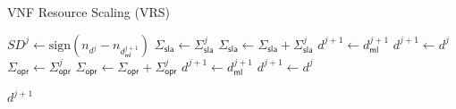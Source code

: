 \documentclass[conference, final]{IEEEtran}
\newcommand{\hlb}[2][blue]{{\color{#1} {#2}}\unskip }
\begin{document}
{\begin{algorithm}[t!]
	\caption{VNF Resource Scaling (VRS)}
	\label{alg:vrs}
	\begin{spacing}{1.05}
\begin{algorithmic}[1]
	
	\State $SD^{j} \gets \text{sign}(n_{d^{j}} - n_{d_{\textsf{ml}}^{j+1}})$
	\label{alg:vrs:SD}
			\State $\Sigma_{\textsf{sla}} \gets \Sigma_{\textsf{sla}}^{j}$
			\label{alg:vrs:new_up}
		\Else
			\State $\Sigma_{\textsf{sla}} \gets \Sigma_{\textsf{sla}} +  \Sigma_{\textsf{sla}}^{j}$
				\label{alg:vrs:sla_cost}
				\State $d^{j+1} \gets d_{\textsf{ml}}^{j+1}$
			\Else
				\State $d^{j+1} \gets d^{j}$
				\label{alg:vrs:scaleup}
			\EndIf		
		\EndIf
		\label{alg:vrs:down_suggest}
			\State $\Sigma_{\textsf{opr}} \gets \Sigma_{\textsf{opr}}^{j}$
		\Else
			\State $\Sigma_{\textsf{opr}} \gets \Sigma_{\textsf{opr}} +  \Sigma_{\textsf{opr}}^{j}$
				\label{alg:vrs:opr_cost}
				\State $d^{j+1} \gets d_{\textsf{ml}}^{j+1}$
			\Else
				\State $d^{j+1} \gets d^{j}$			
			\EndIf
		\EndIf				
	\EndIf
	
	\State \Return $d^{j+1}$
\end{algorithmic}
\end{spacing}
\end{algorithm}

} %
\end{document}
